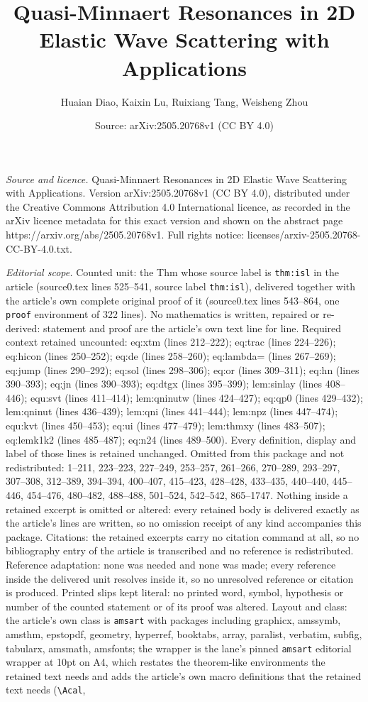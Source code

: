 \documentclass[10pt,a4paper]{amsart}
\title[Quasi-Minnaert Resonances in 2D Elastic Wave Scattering with]{Quasi-Minnaert Resonances in 2D Elastic Wave Scattering with Applications}
\author{Huaian Diao, Kaixin Lu, Ruixiang Tang, Weisheng Zhou}
\date{Source: arXiv:2505.20768v1 (CC BY 4.0)}
\begin{document}
\maketitle

\noindent\emph{Source and licence.} Quasi-Minnaert Resonances in 2D Elastic Wave Scattering with Applications. Version arXiv:2505.20768v1 (CC BY 4.0), distributed under the Creative Commons Attribution 4.0 International licence, as recorded in the arXiv licence metadata for this exact version and shown on the abstract page https://arxiv.org/abs/2505.20768v1. Full rights notice: licenses/arxiv-2505.20768-CC-BY-4.0.txt.\par\smallskip

\noindent\textit{Editorial scope.} Counted unit: the Thm whose source label is \texttt{thm:isl} in the article (source0.tex lines 525--541, source label \texttt{thm:isl}), delivered together with the article's own complete original proof of it (source0.tex lines 543--864, one \texttt{proof} environment of 322 lines). No mathematics is written, repaired or re-derived: statement and proof are the article's own text line for line. Required context retained uncounted: eq:xtm (lines 212--222); eq:trac (lines 224--226); eq:hicon (lines 250--252); eq:de (lines 258--260); eq:lambda= (lines 267--269); eq:jump (lines 290--292); eq:sol (lines 298--306); eq:or (lines 309--311); eq:hn (lines 390--393); eq:jn (lines 390--393); eq:dtgx (lines 395--399); lem:sinlay (lines 408--446); equ:svt (lines 411--414); lem:qninutw (lines 424--427); eq:qp0 (lines 429--432); lem:qninut (lines 436--439); lem:qni (lines 441--444); lem:npz (lines 447--474); equ:kvt (lines 450--453); eq:ui (lines 477--479); lem:thmxy (lines 483--507); eq:lemk1k2 (lines 485--487); eq:n24 (lines 489--500). Every definition, display and label of those lines is retained unchanged. Omitted from this package and not redistributed: 1--211, 223--223, 227--249, 253--257, 261--266, 270--289, 293--297, 307--308, 312--389, 394--394, 400--407, 415--423, 428--428, 433--435, 440--440, 445--446, 454--476, 480--482, 488--488, 501--524, 542--542, 865--1747. Nothing inside a retained excerpt is omitted or altered: every retained body is delivered exactly as the article's lines are written, so no omission receipt of any kind accompanies this package. Citations: the retained excerpts carry no citation command at all, so no bibliography entry of the article is transcribed and no reference is redistributed. Reference adaptation: none was needed and none was made; every reference inside the delivered unit resolves inside it, so no unresolved reference or citation is produced. Printed slips kept literal: no printed word, symbol, hypothesis or number of the counted statement or of its proof was altered. Layout and class: the article's own class is \texttt{amsart} with packages including graphicx, amssymb, amsthm, epstopdf, geometry, hyperref, booktabs, array, paralist, verbatim, subfig, tabularx, amsmath, amsfonts; the wrapper is the lane's pinned \texttt{amsart} editorial wrapper at 10pt on A4, which restates the theorem-like environments the retained text needs and adds the article's own macro definitions that the retained text needs (\texttt{\textbackslash Acal}, 
\end{document}
